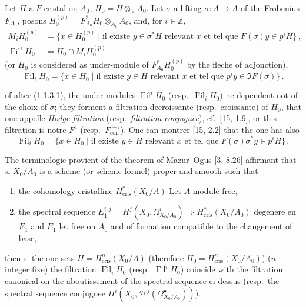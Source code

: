 \documentclass[12pt,a4paper]{article}
\theoremstyle{plain}
\theoremstyle{definition}
\theoremstyle{remark}
\DeclareMathOperator{\Fil}{Fil}
\newcommand{\crys}{\mathrm{cris}}
\begin{document}
Let $H$ a $F$-cristal on $A_0$, $H_0 = H \otimes_A A_0$. Let $\sigma$ a lifting $\sigma : A \to A$ of the Frobenius $F_{A_0}$, posons $H_0^{(p)} = F_{A_0}^*H_0 \otimes_{A_0} A_0$, and, for $i \in \mathbb{Z}$,
\begin{align}
M_iH_0^{(p)} &= \{x \in H_0^{(p)} \mid \text{il existe } y \in \sigma^*H \text{ relevant } x \text{ et tel que } F(\sigma)y \in p^iH\}\,, \label{eq:1.3.1.1} \\
\Fil^iH_0 &= H_0 \cap M_iH_0^{(p)} \label{eq:1.3.1.2}
\end{align}
(or $H_0$ is considered as under-module of $F_{A_0}^*H_0^{(p)}$ by the fleche of adjonction),
\begin{equation}\label{eq:1.3.1.3}
\Fil_iH_0 = \{x \in H_0 \mid \text{il existe } y \in H \text{ relevant } x \text{ et tel que } p^iy \in \Im F(\sigma)\}\,.\end{equation}

of after (1.1.3.1), the under-modules $\Fil^iH_0$ (resp.\ $\Fil_iH_0$) ne dependent not of the choix of $\sigma$; they forment a filtration decroissante (resp.\ croissante) of $H_0$, that one appelle \emph{Hodge filtration} (resp.\ \emph{filtration conjuguee}), cf.\ [15, 1.9], or this filtration is notre $F^{\,i}$ (resp.\ $F_{\mathrm{con}}^{\,-i}$). One can montrer [15, 2.2] that the one has also
\begin{equation}\label{eq:1.3.1.4}
\Fil_iH_0 = \{x \in H_0 \mid \text{il existe } y \in H \text{ relevant } x \text{ et tel que } F(\sigma)\sigma^*y \in p^iH\}\,.\end{equation}

The terminologie provient of the theorem of Mazur--Ogus [3, 8.26] affirmant that si $X_0/A_0$ is a scheme (or scheme formel) proper and smooth such that
\begin{enumerate}[label=(\roman*)]
\item the cohomology cristalline $H_{\crys}^*(X_0/A)$ Let $A$-module free,
\item the spectral sequence $E_1^{i,j} = H^j(X_0, \Omega_{X_0/A_0}^i) \Rightarrow H_{\crys}^*(X_0/A_0)$ degenere en $E_1$ and $E_1$ let free on $A_0$ and of formation compatible to the changement of base,
\end{enumerate}
then si the one sets $H = H_{\crys}^n(X_0/A)$ (therefore $H_0 = H_{\crys}^n(X_0/A_0)$) ($n$ integer fixe) the filtration $\Fil_iH_0$ (resp.\ $\Fil^iH_0$) coincide with the filtration canonical on the aboutissement of the spectral sequence ci-dessus (resp.\ the spectral sequence conjuguee $H^i(X_0, \mathcal{H}^j(\Omega_{X_0/A_0}^\bullet))$).
\end{document}
